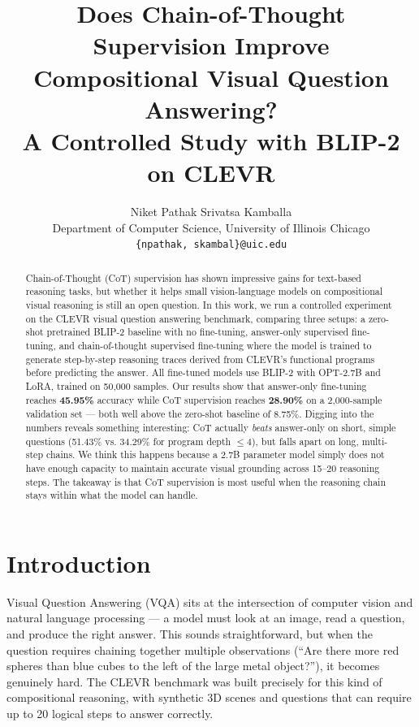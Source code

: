 \documentclass[11pt,twocolumn]{article}
\title{Does Chain-of-Thought Supervision Improve\\Compositional Visual Question Answering?\\A Controlled Study with BLIP-2 on CLEVR}
\author{
  Niket Pathak \quad Srivatsa Kamballa \\
  Department of Computer Science, University of Illinois Chicago \\
  \texttt{\{npathak, skambal\}@uic.edu}
}
\makeatletter
\renewcommand{\maketitle}{%
  \twocolumn[{%
    \centering
    {\LARGE\bfseries \@title \par}\vspace{0.5em}
    {\large \@author \par}\vspace{1em}
  }]
}
\makeatother
\begin{document}
\maketitle

\begin{abstract}
Chain-of-Thought (CoT) supervision has shown impressive gains for text-based reasoning tasks, but whether it helps small vision-language models on compositional visual reasoning is still an open question. In this work, we run a controlled experiment on the CLEVR visual question answering benchmark, comparing three setups: a zero-shot pretrained BLIP-2 baseline with no fine-tuning, answer-only supervised fine-tuning, and chain-of-thought supervised fine-tuning where the model is trained to generate step-by-step reasoning traces derived from CLEVR's functional programs before predicting the answer. All fine-tuned models use BLIP-2 with OPT-2.7B and LoRA, trained on 50,000 samples. Our results show that answer-only fine-tuning reaches \textbf{45.95\%} accuracy while CoT supervision reaches \textbf{28.90\%} on a 2,000-sample validation set — both well above the zero-shot baseline of 8.75\%. Digging into the numbers reveals something interesting: CoT actually \textit{beats} answer-only on short, simple questions (51.43\% vs. 34.29\% for program depth $\leq$4), but falls apart on long, multi-step chains. We think this happens because a 2.7B parameter model simply does not have enough capacity to maintain accurate visual grounding across 15--20 reasoning steps. The takeaway is that CoT supervision is most useful when the reasoning chain stays within what the model can handle.
\end{abstract}

\section{Introduction}

Visual Question Answering (VQA) sits at the intersection of computer vision and natural language processing — a model must look at an image, read a question, and produce the right answer. This sounds straightforward, but when the question requires chaining together multiple observations (``Are there more red spheres than blue cubes to the left of the large metal object?''), it becomes genuinely hard. The CLEVR benchmark \cite{johnson2017clevr} was built precisely for this kind of compositional reasoning, with synthetic 3D scenes and questions that can require up to 20 logical steps to answer correctly.
\end{document}
